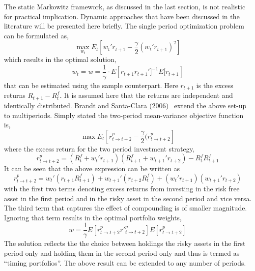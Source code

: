 The static Markowitz framework, as discussed in the last section, is not realistic for practical implication. Dynamic approaches that have been discussed in the literature will be presented here briefly. The single period optimization problem can be formulated as,
	\begin{equation}\label{eqn:periodopt}
	\max_{w_t} E_t \left[ w_t' r_{t+1} - \frac{\gamma}{2}(w_t' r_{t+1})^2\right]
	\end{equation} 
which results in the optimal solution,
	\begin{equation}\label{eqn:periodoptimal}
	w_t= w= \frac{1}{\gamma} \cdot E\left[r_{t+1} r_{t+1}']^{-1} E[r_{t+1}\right]
	\end{equation}	
that can be estimated using the sample counterpart. Here $r_{t+1}$ is the excess returns $R_{t+1} - R_t^f$. It is assumed here that the returns are independent and identically distributed. Brandt and Santa-Clara (2006)~\cite{bransc} extend the above set-up to multiperiods. Simply stated the two-period mean-variance objective function is,
	\begin{equation}\label{eqn:twoperiodmv}
	\max E_t \left[ r^p_{t \to t+2} - \frac{\gamma}{2} ( r^p_{t \to t+2}\right]
	\end{equation}
where the excess return for the two period investment strategy,
	\begin{equation}\label{eqn:twoperexcess}
	r^p_{t \to t+2} = (R_t^f + w_t' r_{t+1}) ( R^f_{t+1} + w_{t+1}' r_{t+2}) - R_t^f R_{t+1}^f
	\end{equation}	
It can be seen that the above expression can be written as 
	\begin{equation}\label{eqn:rewritten}
	r^p_{t \to t+2} = w_t' (r_{t+1} R_{t+1}^f) + w_{t+1}' (r_{t+2}R_t^f) + (w_t' r_{t+1})(w_{t+1}' r_{t+2})
	\end{equation}
with the first two terms denoting excess returns from investing in the risk free asset in the first period and in the risky asset in the second period and vice versa. The third term that captures the effect of compounding is of smaller magnitude. Ignoring that term results in the optimal portfolio  weights,
	\begin{equation}\label{eqn:optimalweights}
	w= \frac{1}{\gamma} E\left[ r^{p}_{t \to t+2} {r'}^p_{t\to t+2} \right] E[r^{p}_{t \to t+2}]
	\end{equation}
The solution reflects the the choice between holdings the risky assets in the first period only and holding them in the second period only and thus is termed as ``timing portfolios''. The above result can be extended to any number of periods. \\


